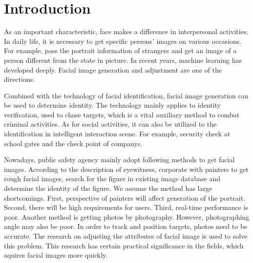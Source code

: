 \section{Introduction}
As an important characteristic, face makes a difference in interpersonal activities.
In daily life, it is necessary to get specific persons' images on various occasions.
For example, pass the portrait information of strangers and get an image of a person different from the state in picture.
In recent years, machine learning has developed deeply.
Facial image generation and adjustment are one of the directions.

Combined with the technology of facial identification, facial image generation can be used to determine identity.
The technology mainly applies to identity verification, used to chase targets, which is a vital auxiliary method to combat criminal activities.
As for social activities, it can also be utilized to the identification in intelligent interaction scene.
For example, security check at school gates and the check point of companys.

Nowadays, public safety agency mainly adopt following methods to get facial images.
According to the description of eyewitness, corporate with painters to get rough facial images,
    search for the figure in existing image database and determine the identity of the figure.
We assume the method has large shortcomings.
First, perspective of painters will affect generation of the portrait.
    Second, there will be high requirements for users.
    Third, real-time performance is poor.
Another method is getting photos by photography. However, photographing angle may also be poor.
In order to track and position targets, photos need to be accurate.
The research on adjusting the attributes of facial image is used to solve this problem.
This research has certain practical significance in the fields, which aquires facial images more quickly. 